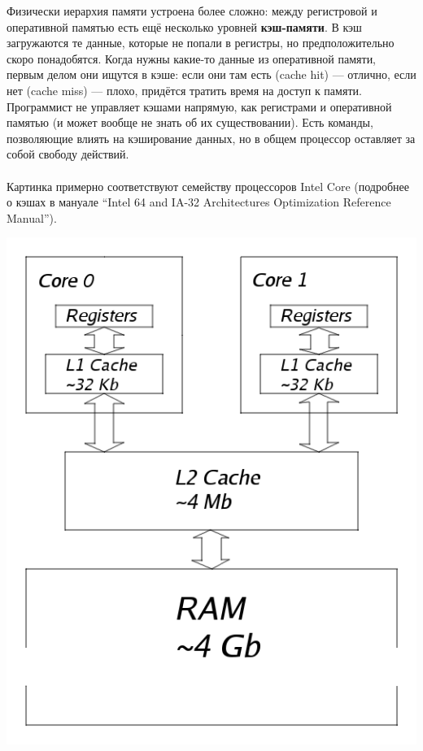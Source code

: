 \documentclass[11pt]{book}
\begin{document}
\bigskip
\begin{minipage}{0.6\textwidth}
Физически иерархия памяти устроена более сложно:
между регистровой и оперативной памятью есть ещё несколько уровней \textbf{кэш-памяти}.
В кэш загружаются те данные, которые не попали в регистры, но предположительно скоро понадобятся.
Когда нужны какие-то данные из оперативной памяти, первым делом они ищутся в кэше:
если они там есть (cache hit) --- отлично, если нет (cache miss) --- плохо, придётся тратить время на доступ к памяти.
Программист не управляет кэшами напрямую, как регистрами и оперативной памятью (и может вообще не знать об их существовании).
Есть команды, позволяющие влиять на кэширование данных, но в общем процессор оставляет за собой свободу действий.
\\ \\
Картинка примерно соответствуют семейству процессоров Intel Core
(подробнее о кэшах в мануале ``Intel 64 and IA-32 Architectures Optimization Reference Manual'').
\end{minipage}
\begin{minipage}{0.4\textwidth}
\centering
\includegraphics[width=\textwidth]{pic/caches.png}
\end{minipage}
\end{document}
